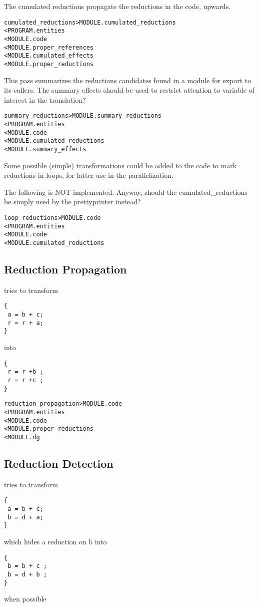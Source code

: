\documentclass[a4paper]{report}
\newenvironment{PipsMake}{\begin{alltt}}{\end{alltt}}
\newenvironment{PipsPass}[1]{\label{pass:#1}}{}
\begin{document}
The cumulated reductions propagate the reductions in the code, upwards.

\begin{PipsMake}
cumulated_reductions > MODULE.cumulated_reductions
  < PROGRAM.entities
  < MODULE.code
  < MODULE.proper_references
  < MODULE.cumulated_effects
  < MODULE.proper_reductions
\end{PipsMake}

This pass summarizes the reductions candidates found in a module for
export to its callers. The summary effects should be used to restrict
attention to variable of interest in the translation?

\begin{PipsMake}
summary_reductions > MODULE.summary_reductions
  < PROGRAM.entities
  < MODULE.code
  < MODULE.cumulated_reductions
  < MODULE.summary_effects
\end{PipsMake}

Some possible (simple) transformations could be added to the code to mark
reductions in loops, for latter use in the parallelization.

The following is NOT implemented. Anyway, should the cumulated\_reductions
be simply used by the prettyprinter instead?
\begin{PipsMake}
loop_reductions > MODULE.code
  < PROGRAM.entities
  < MODULE.code
  < MODULE.cumulated_reductions
\end{PipsMake}


\subsection{Reduction Propagation}
\begin{PipsPass}{reduction_propagation}
 tries to transform
 \begin{lstlisting}
{
 a = b + c;
 r = r + a;
}
 \end{lstlisting}
 into
 \begin{lstlisting}
{
 r = r +b ;
 r = r +c ;
}
 \end{lstlisting}
\end{PipsPass}
\begin{PipsMake}
reduction_propagation > MODULE.code
  < PROGRAM.entities
  < MODULE.code
  < MODULE.proper_reductions
  < MODULE.dg
\end{PipsMake}

\subsection{Reduction Detection}
\begin{PipsPass}{reduction_detection}
 tries to transform
 \begin{lstlisting}
{
 a = b + c;
 b = d + a;
}
 \end{lstlisting}
 which hides a reduction on b
 into
 \begin{lstlisting}
{
 b = b + c ;
 b = d + b ;
}
 \end{lstlisting}
 when possible
\end{PipsPass}
\end{document}
